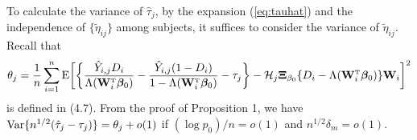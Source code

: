 \documentclass[12pt]{article}
\numberwithin{equation}{section}
\def\be{\begin{equation}}
\def\ee{\end{equation}}
\def\nn{\nonumber}
\def\T{{ \mathrm{\scriptscriptstyle T} }}
\newcommand{\E}{\rm E}
\newcommand{\V}{\rm Var}
\newcommand{\bW}{{\mathbf W}}
\newcommand{\bbeta}  {\boldsymbol{\beta}}
\newcommand{\bXi}{\boldsymbol{\Xi}}
\begin{document}

\medskip
{} To calculate the variance of $\hat{\tau}_j$, by the expansion (\ref{eq:tauhat}) and the independence of $\{\tilde{\eta}_{ij}\}$ among subjects, it suffices to consider the variance of $\tilde{\eta}_{ij}$.
Recall that  
$$\theta_j = \frac{1}{n} \sum_{i = 1}^{n} {\E}\bigg[ \bigg\{\frac{\hat{Y}_{i, j}D_{i}}{\Lambda(\bW_{i}^{\T}\bbeta_{0})} - \frac{\hat{Y}_{i, j}(1 - D_{i})}{1 - \Lambda(\bW_{i}^{\T}\bbeta_{0})}  - \tau_j \bigg\} - \mathcal{H}_{j} \bXi_{\beta_{0}} \{D_{i} - \Lambda(\bW_{i}^{\T}\bbeta_{0})\} \bW_{i} \bigg]^{2}$$
is defined in (4.7).
From the proof of Proposition 1, we have ${\V}\{n^{1/2}(\hat{\tau}_j - \tau_j)\} = \theta_j + o(1)$
if $(\log p_0) / n = o(1)$ and $n^{1/2} \delta_{m} = o(1)$.
\end{document}
